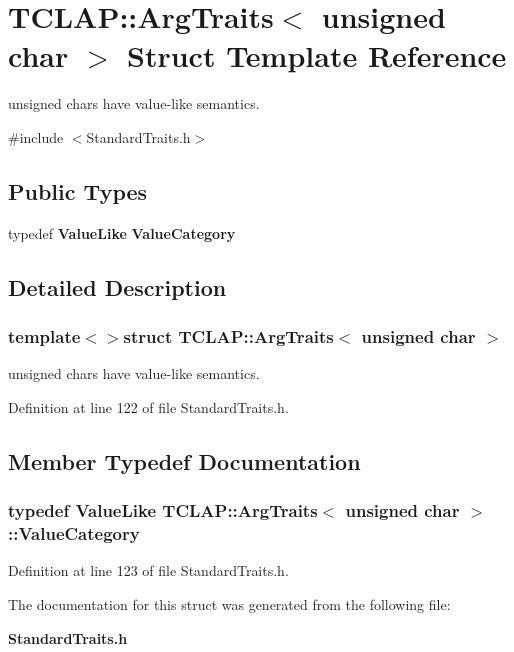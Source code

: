 \section{T\+C\+L\+A\+P\+:\+:Arg\+Traits$<$ unsigned char $>$ Struct Template Reference}
\label{structTCLAP_1_1ArgTraits_3_01unsigned_01char_01_4}


unsigned chars have value-\/like semantics.  




{\ttfamily \#include $<$Standard\+Traits.\+h$>$}

\subsection*{Public Types}
\begin{DoxyCompactItemize}
\item 
typedef {\bf Value\+Like} {\bf Value\+Category}
\end{DoxyCompactItemize}


\subsection{Detailed Description}
\subsubsection*{template$<$$>$struct T\+C\+L\+A\+P\+::\+Arg\+Traits$<$ unsigned char $>$}

unsigned chars have value-\/like semantics. 

Definition at line 122 of file Standard\+Traits.\+h.



\subsection{Member Typedef Documentation}
\subsubsection[{Value\+Category}]{\setlength{\rightskip}{0pt plus 5cm}typedef {\bf Value\+Like} {\bf T\+C\+L\+A\+P\+::\+Arg\+Traits}$<$ unsigned char $>$\+::{\bf Value\+Category}}\label{structTCLAP_1_1ArgTraits_3_01unsigned_01char_01_4_a3cba1e41ab04d31c7b68b1c5e6e227aa}


Definition at line 123 of file Standard\+Traits.\+h.



The documentation for this struct was generated from the following file\+:\begin{DoxyCompactItemize}
\item 
{\bf Standard\+Traits.\+h}\end{DoxyCompactItemize}
